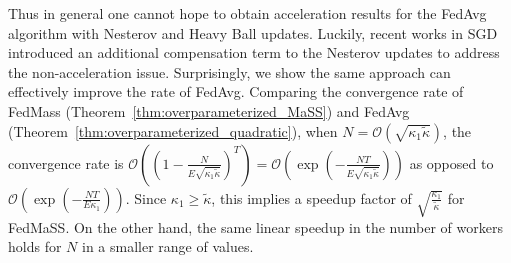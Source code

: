 Thus in general one cannot hope to obtain acceleration results for
the FedAvg algorithm with Nesterov and Heavy Ball updates. 
Luckily, recent works in SGD~\cite{jain2017accelerating,liu2018accelerating} introduced
an additional compensation term to the Nesterov updates to address the non-acceleration issue. Surprisingly, 
we show the same approach can effectively improve the rate of FedAvg.
Comparing the convergence rate of FedMass (Theorem~\ref{thm:overparameterized_MaSS}) and FedAvg (Theorem~\ref{thm:overparameterized_quadratic}), when $N=\mathcal{O}(\sqrt{\kappa_{1}\tilde{\kappa}})$,
the convergence rate is $\mathcal{O}((1-\frac{N}{E\sqrt{\kappa_{1}\tilde{\kappa}}})^{T})=\mathcal{O}(\exp(-\frac{NT}{E\sqrt{\kappa_{1}\tilde{\kappa}}}))$
as opposed to $\mathcal{O}(\exp(-\frac{NT}{E\kappa_{1}}))$. Since
$\kappa_{1}\geq\tilde{\kappa}$, this implies a speedup factor of
$\sqrt{\frac{\kappa_{1}}{\tilde{\kappa}}}$ for FedMaSS. On the other
hand, the same linear speedup in the number of workers holds for $N$
in a smaller range of values. 